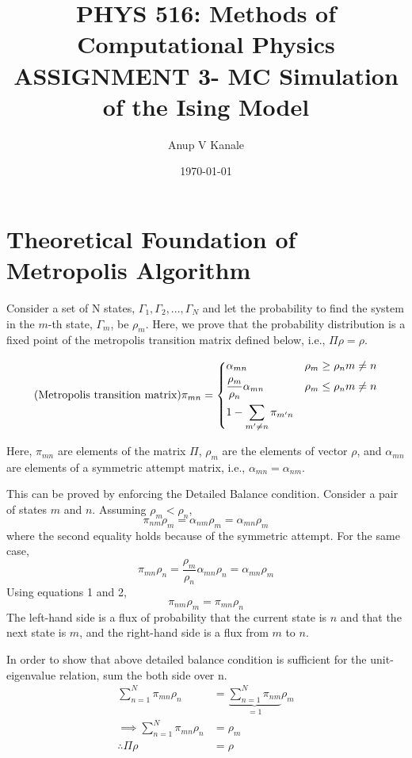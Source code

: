 \documentclass[11pt, oneside]{article}   	%
\title{\vspace{-6ex}\large PHYS 516: Methods of Computational Physics \\
  \normalsize ASSIGNMENT 3- MC Simulation of the Ising Model}
\author{Anup V Kanale}
\date{\vspace{-3ex}\today}							%
\begin{document}
\maketitle
\section{Theoretical Foundation of Metropolis Algorithm}
Consider a set of N states, {$\Gamma_1, \Gamma_2, ..., \Gamma_N$} and let the probability to find the system in the $m$-th state, $\Gamma_m$, be $\rho_m$. Here, we prove that the probability distribution is a fixed point of the metropolis transition matrix defined below, i.e., $\Pi \rho = \rho$.

\[
\text{(Metropolis transition matrix)} \pi_{mn}= 
\begin{dcases}
	\alpha_{mn} & \rho_m \geq \rho_n m \neq n \\
    \frac{\rho_m}{\rho_n} \alpha_{mn} & \rho_m \leq \rho_n m \neq n \\
    1- \sum\limits_{m' \neq n} \pi_{m'n}
\end{dcases}
\]

Here, $\pi_{mn}$ are elements of the matrix $\Pi$, $\rho_m$ are the elements of vector $\rho$, and $\alpha_{mn}$ are elements of a symmetric attempt matrix, i.e., $\alpha_{mn}= \alpha_{nm}$.

This can be proved by enforcing the Detailed Balance condition. Consider a pair of states $m$ and $n$. Assuming $\rho_m < \rho_n$, 
	\begin{equation}
	\pi_{nm} \rho_m = \alpha_{nm} \rho_m = \alpha_{mn} \rho_m
	\end{equation}
where the second equality holds because of the symmetric attempt.
For the same case,
	\begin{equation}
	\pi_{mn} \rho_n = \frac{\rho_m}{\rho_n} \alpha_{mn} \rho_n = \alpha_{mn} \rho_m
	\end{equation}
Using equations 1 and 2,
	\begin{equation}
	\pi_{nm} \rho_m = \pi_{mn} \rho_n
	\end{equation}
The left-hand side is a flux of probability that the current state is $n$ and that the next state is $m$, and the right-hand side is a flux from $m$ to $n$.

In order to show that above detailed balance condition is sufficient for the unit-eigenvalue relation, sum
the both side over n.
	\begin{align}
	\sum\limits_{n=1}^{N} \pi_{mn} \rho_n &= \underbrace{\sum\limits_{n=1}^{N} \pi_{nm}}_{=1} \rho_m \\
	\implies \sum\limits_{n=1}^{N} \pi_{mn} \rho_n &= \rho_m \\
	\therefore \Pi \rho &= \rho
	\end{align}
	
\end{document}
